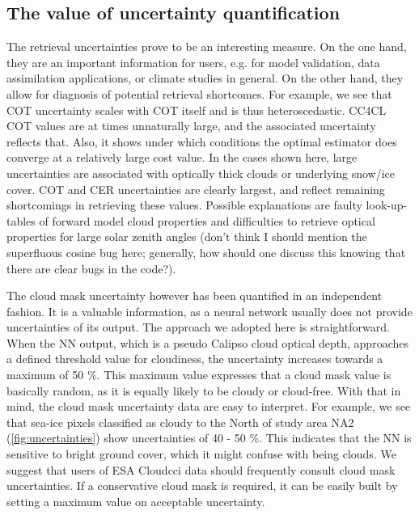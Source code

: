 \subsection{The value of uncertainty quantification}


The retrieval uncertainties prove to be an interesting measure. On the one hand, they are an important information for users, e.g. for model validation, data assimilation applications, or climate studies in general. On the other hand, they allow for diagnosis of potential retrieval shortcomes. For example, we see that COT uncertainty scales with COT itself and is thus heteroscedastic. CC4CL COT values are at times unnaturally large, and the associated uncertainty reflects that. Also, it shows under which conditions the optimal estimator does converge at a relatively large cost value. In the cases shown here, large uncertainties are associated with optically thick clouds or underlying snow/ice cover. COT and CER uncertainties are clearly largest, and reflect remaining shortcomings in retrieving these values. Possible explanations are faulty look-up-tables of forward model cloud properties and difficulties to retrieve optical properties for large solar zenith angles (don't think I should mention the superfluous cosine bug here; generally, how should one discuss this knowing that there are clear bugs in the code?).

The cloud mask uncertainty however has been quantified in an independent fashion. It is a valuable information, as a neural network usually does not provide uncertainties of its output. The approach we adopted here is straightforward. When the NN output, which is a pseudo Calipso cloud optical depth, approaches a defined threshold value for cloudiness, the uncertainty increases towards a maximum of 50 \%. This maximum value expresses that a cloud mask value is basically random, as it is equally likely to be cloudy or cloud-free. With that in mind, the cloud mask uncertainty data are easy to interpret. For example, we see that sea-ice pixels classified as cloudy to the North of study area NA2 (\cref{fig:uncertainties}) show uncertainties of 40 - 50 \%. This indicates that the NN is sensitive to bright ground cover, which it might confuse with being clouds. We suggest that users of ESA Cloud\textunderscore cci data should frequently consult cloud mask uncertainties. If a conservative cloud mask is required, it can be easily built by setting a maximum value on acceptable uncertainty.

